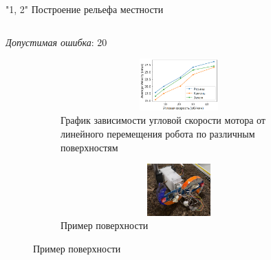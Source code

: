 \documentclass[aspectratio=169,xcolor=table,10pt]{beamer}
\begin{document}
\begin{frame}[t]{"1, 2" Построение рельефа местности}
\begin{columns}[T,onlytextwidth]
\begin{column}{0.49\textwidth}
            \textit{Допустимая ошибка}: 20%

            \begin{figure}[H]
                \begin{subfigure}{0.49\textwidth}
                    \centering\includegraphics[height=2cm,width=1\textwidth,keepaspectratio]{../images/slides/avg_lin_vel_rev_min.png}
                    \caption{График зависимости угловой скорости мотора от линейного перемещения робота по различным поверхностям}
                    \label{fig:../images/slides/avg_lin_vel_rev_min.png}
                \end{subfigure}
                \begin{subfigure}{0.49\textwidth}
                    \centering\includegraphics[height=2cm,width=1\textwidth,keepaspectratio]{../images/slides/data.png}
                    \caption{Пример поверхности}
                    \label{fig:../images/slides/data.png}
                \end{subfigure}
            \end{figure}
        \end{column}
    \end{columns}
\end{frame}
\end{document}
